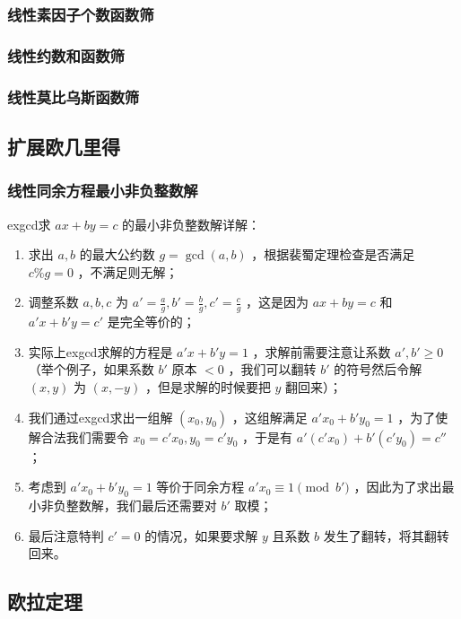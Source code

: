 \documentclass{article}
\begin{document}
\subsubsection{线性素因子个数函数筛}

\subsubsection{线性约数和函数筛}

\subsubsection{线性莫比乌斯函数筛}

\subsection{扩展欧几里得}
\subsubsection{线性同余方程最小非负整数解}
exgcd求 $ax+by=c$ 的最小非负整数解详解：
\begin{enumerate}
    \item 求出 $a,b$ 的最大公约数 $g=\gcd(a,b)$ ，根据裴蜀定理检查是否满足 $c\% g=0$ ，不满足则无解；
    \item 调整系数 $a,b,c$ 为 $a'=\frac{a}{g},b'=\frac{b}{g},c'=\frac{c}{g}$ ，这是因为 $ax+by=c$ 和 $a'x+b'y=c'$ 是完全等价的；
    \item 实际上exgcd求解的方程是 $a'x+b'y=1$ ，求解前需要注意让系数 $a',b'\geq 0$ （举个例子，如果系数 $b'$ 原本 $<0$ ，我们可以翻转 $b'$ 的符号然后令解 $(x,y)$ 为 $(x,-y)$ ，但是求解的时候要把 $y$ 翻回来）；
    \item 我们通过exgcd求出一组解 $(x_0,y_0)$ ，这组解满足 $a'x_0+b'y_0=1$ ，为了使解合法我们需要令 $x_0=c'x_0,y_0=c'y_0$ ，于是有 $a'(c'x_0)+b'(c'y_0)=c''$ ；
    \item 考虑到 $a'x_0+b'y_0=1$ 等价于同余方程 $a'x_0\equiv 1\pmod{b'}$ ，因此为了求出最小非负整数解，我们最后还需要对 $b'$ 取模；
    \item 最后注意特判 $c'=0$ 的情况，如果要求解 $y$ 且系数 $b$ 发生了翻转，将其翻转回来。
\end{enumerate}


\subsection{欧拉定理}
\end{document}
